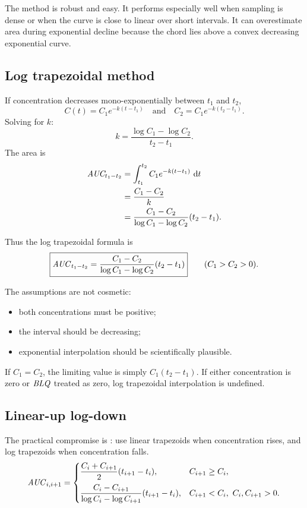 \documentclass[a4paper]{article}
\newcommand{\BLQ}{\ensuremath{\pksym{BLQ}}}
\begin{document}
The method is robust and easy. It performs especially well when sampling is dense or when the curve is close to linear over short intervals. It can overestimate area during exponential decline because the chord lies above a convex decreasing exponential curve.

\subsection{Log trapezoidal method}

If concentration decreases mono-exponentially between \(t_1\) and \(t_2\),
\[
  C(t)=C_1e^{-k(t-t_1)}
  \quad\text{and}\quad
  C_2=C_1e^{-k(t_2-t_1)}.
\]
Solving for \(k\):
\[
  k=\frac{\log C_1-\log C_2}{t_2-t_1}.
\]
The area is
\[
\begin{aligned}
  \pksym{AUC}_{t_1-t_2}
  &=\int_{t_1}^{t_2} C_1e^{-k(t-t_1)}\,\dd t\\
  &=\frac{C_1-C_2}{k}\\
  &=\frac{C_1-C_2}{\log C_1-\log C_2}(t_2-t_1).
\end{aligned}
\]

Thus the log trapezoidal formula is
\[
  \boxed{
  \pksym{AUC}_{t_1-t_2}
  =
  \frac{C_1-C_2}{\log C_1-\log C_2}(t_2-t_1)
  }
  \qquad (C_1>C_2>0).
\]

The assumptions are not cosmetic:
\begin{itemize}[leftmargin=2em]
  \item both concentrations must be positive;
  \item the interval should be decreasing;
  \item exponential interpolation should be scientifically plausible.
\end{itemize}

If \(C_1=C_2\), the limiting value is simply \(C_1(t_2-t_1)\). If either concentration is zero or \BLQ{} treated as zero, log trapezoidal interpolation is undefined.

\subsection{Linear-up log-down}

The practical compromise is : use linear trapezoids when concentration rises, and log trapezoids when concentration falls.
\[
\pksym{AUC}_{i,i+1}
=
\begin{cases}
\dfrac{C_i+C_{i+1}}{2}(t_{i+1}-t_i), & C_{i+1}\geq C_i,\\[8pt]
\dfrac{C_i-C_{i+1}}{\log C_i-\log C_{i+1}}(t_{i+1}-t_i), & C_{i+1}<C_i,\ C_i,C_{i+1}>0.
\end{cases}
\]
\end{document}
